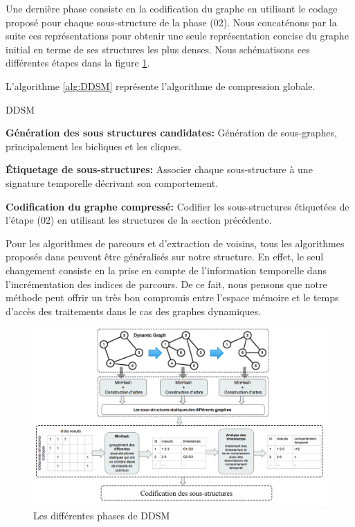			 
			 \vskip 0.1in
			 
			 Une dernière phase consiste en la codification du graphe en utilisant le codage proposé pour chaque sous-structure de la phase (02). Nous concaténons par la suite ces représentations pour obtenir une seule représentation concise du graphe initial en terme de ses structures les plus denses. Nous schématisons ces différentes étapes dans la figure \ref{ddsmScheme}.
			 
			 

			  
			L'algorithme \ref{alg:DDSM} représente l'algorithme de compression globale.
			\begin{algorithm}
					
					\caption{DDSM}
					\label{alg:DDSM}
				\begin{algorithmic} [1]
					\STATE \textbf{Génération des sous structures candidates: }Génération de sous-graphes, principalement les bicliques et les cliques.
					
					\STATE  \textbf{Étiquetage de sous-structures: }Associer chaque sous-structure à une signature temporelle décrivant son comportement.
					
					\STATE \textbf{Codification du graphe compressé: }Codifier les sous-structures étiquetées de l'étape (02) en utilisant les structures de la section précédente.
				\end{algorithmic}
			\end{algorithm}
			
			
		Pour les algorithmes de parcours et d'extraction de voisins, tous les algorithmes proposés dans \citep{hernandez2014compressed} peuvent être généralisés sur notre structure. En effet, le seul changement consiste en la  prise en compte de l'information temporelle dans l'incrémentation des indices de parcours. De ce fait, nous pensons que notre méthode peut offrir un très bon compromis entre l'espace mémoire et le temps d'accès des traitements dans le cas des graphes dynamiques. 
		
		\begin{figure}[H]
\centering
	\includegraphics[scale=0.4]{./ressources/image/ddsm_scheme.png}
	\caption[Les différentes phases de DDSM]{Les différentes phases de DDSM}
	\label{ddsmScheme}
\end{figure}
			
